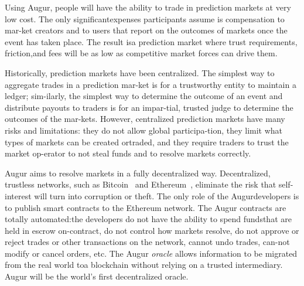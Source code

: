 \documentclass[12pt,floatfix,reprint,nofootinbib,amsmath,amssymb,epsfig,pre,floats,letterpaper,groupedaffiliation]{revtex4-1}
\theoremstyle{definition}
\theoremstyle{definition}
\begin{document}
Using Augur, people will have the ability to trade in prediction markets at very low cost. The only significant\linebreak expenses participants assume is compensation to mar-\linebreak ket creators and to users that report on the outcomes of markets once the event has taken place. The result is\linebreak a prediction market where trust requirements, friction,\linebreak and fees will be as low as competitive market forces can drive them.

Historically, prediction markets have been centralized. The simplest way to aggregate trades in a prediction mar-\linebreak ket is for a trustworthy entity to maintain a ledger; sim-\linebreak ilarly, the simplest way to determine the outcome of an event and distribute payouts to traders is for an impar-\linebreak tial, trusted judge to determine the outcomes of the mar-\linebreak kets. However, centralized prediction markets have many risks and limitations: they do not allow global participa-\linebreak tion, they limit what types of markets can be created or\linebreak traded, and they require traders to trust the market op-\linebreak erator to not steal funds and to resolve markets correctly.

Augur aims to resolve markets in a fully decentralized way. Decentralized, trustless networks, such as Bitcoin~\cite{Nakamoto_2008} and Ethereum~\cite{Buterin_2013}, eliminate the risk that self-interest will turn into corruption or theft. The only role of the Augur\linebreak developers is to publish smart contracts to the Ethereum network. The Augur contracts are totally automated:\linebreak the developers do not have the ability to spend funds\linebreak that are held in escrow on-contract, do not control how markets resolve, do not approve or reject trades or other transactions on the network, cannot undo trades, can-\linebreak not modify or cancel orders, etc. The Augur \textit{oracle} allows information to be migrated from the real world to\linebreak a blockchain without relying on a trusted intermediary. Augur will be the world's first decentralized oracle.
\end{document}
